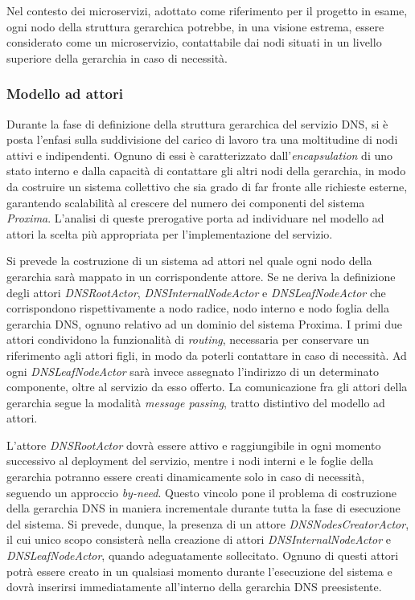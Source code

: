 \documentclass[a4paper,12pt]{report}
\begin{document}
Nel contesto dei microservizi, adottato come riferimento per il progetto in esame, ogni nodo della struttura gerarchica potrebbe, in una visione estrema, essere considerato come un microservizio, contattabile dai nodi situati in un livello superiore della gerarchia in caso di necessità.

\subsubsection{Modello ad attori} \label{dns-actormodel}
Durante la fase di definizione della struttura gerarchica del servizio DNS, si è posta l'enfasi sulla suddivisione del carico di lavoro tra una moltitudine di nodi attivi e indipendenti. Ognuno di essi è caratterizzato dall'\emph{encapsulation} di uno stato interno e dalla capacità di contattare gli altri nodi della gerarchia, in modo da costruire un sistema collettivo che sia grado di far fronte alle richieste esterne, garantendo scalabilità al crescere del numero dei componenti del sistema \emph{Proxima}. L'analisi di queste prerogative porta ad individuare nel modello ad attori la scelta più appropriata per l'implementazione del servizio.

Si prevede la costruzione di un sistema ad attori nel quale ogni nodo della gerarchia sarà mappato in un corrispondente attore. Se ne deriva la definizione degli attori \emph{DNSRootActor}, \emph{DNSInternalNodeActor} e \emph{DNSLeafNodeActor} che corrispondono rispettivamente a nodo radice, nodo interno e nodo foglia della gerarchia DNS, ognuno relativo ad un dominio del sistema Proxima. I primi due attori condividono la funzionalità di \emph{routing}, necessaria per conservare un riferimento agli attori figli, in modo da poterli contattare in caso di necessità. Ad ogni \emph{DNSLeafNodeActor} sarà invece assegnato l'indirizzo di un determinato componente, oltre al servizio da esso offerto. La comunicazione fra gli attori della gerarchia segue la modalità \emph{message passing}, tratto distintivo del modello ad attori.

L'attore \emph{DNSRootActor} dovrà essere attivo e raggiungibile in ogni momento successivo al deployment del servizio, mentre i nodi interni e le foglie della gerarchia potranno essere creati dinamicamente solo in caso di necessità, seguendo un approccio \emph{by-need}. Questo vincolo pone il problema di costruzione della gerarchia DNS in maniera incrementale durante tutta la fase di esecuzione del sistema. Si prevede, dunque, la presenza di un attore \emph{DNSNodesCreatorActor}, il cui unico scopo consisterà nella creazione di attori \emph{DNSInternalNodeActor} e \emph{DNSLeafNodeActor}, quando adeguatamente sollecitato. Ognuno di questi attori potrà essere creato in un qualsiasi momento durante l'esecuzione del sistema e dovrà inserirsi immediatamente all'interno della gerarchia DNS preesistente. 
\end{document}
